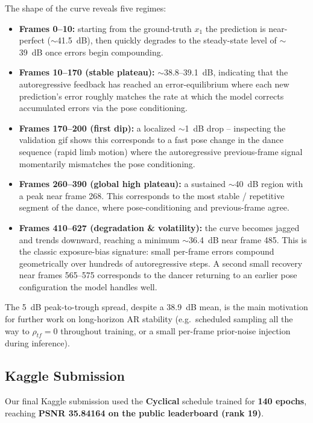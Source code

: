 \documentclass[10pt,twocolumn,letterpaper]{article}
\begin{document}
\noindent The shape of the curve reveals five regimes:
\begin{itemize}
    \item \textbf{Frames 0--10:} starting from the ground-truth $x_1$ the prediction is near-perfect ($\sim$41.5~dB), then quickly degrades to the steady-state level of $\sim$39~dB once errors begin compounding.
    \item \textbf{Frames 10--170 (stable plateau):} $\sim$38.8--39.1~dB, indicating that the autoregressive feedback has reached an error-equilibrium where each new prediction's error roughly matches the rate at which the model corrects accumulated errors via the pose conditioning.
    \item \textbf{Frames 170--200 (first dip):} a localized $\sim$1~dB drop -- inspecting the validation gif shows this corresponds to a fast pose change in the dance sequence (rapid limb motion) where the autoregressive previous-frame signal momentarily mismatches the pose conditioning.
    \item \textbf{Frames 260--390 (global high plateau):} a sustained $\sim$40~dB region with a peak near frame 268. This corresponds to the most stable / repetitive segment of the dance, where pose-conditioning and previous-frame agree.
    \item \textbf{Frames 410--627 (degradation \& volatility):} the curve becomes jagged and trends downward, reaching a minimum $\sim$36.4~dB near frame 485. This is the classic exposure-bias signature: small per-frame errors compound geometrically over hundreds of autoregressive steps. A second small recovery near frames 565--575 corresponds to the dancer returning to an earlier pose configuration the model handles well.
\end{itemize}

The 5~dB peak-to-trough spread, despite a 38.9~dB mean, is the main motivation for further work on long-horizon AR stability (e.g.\ scheduled sampling all the way to $\rho_{tf}\!=\!0$ throughout training, or a small per-frame prior-noise injection during inference).

\subsection{Kaggle Submission}
\label{sec:kaggle}

Our final Kaggle submission used the \textbf{Cyclical} schedule trained for \textbf{140 epochs}, reaching \textbf{PSNR 35.84164 on the public leaderboard (rank 19)}.
\end{document}
